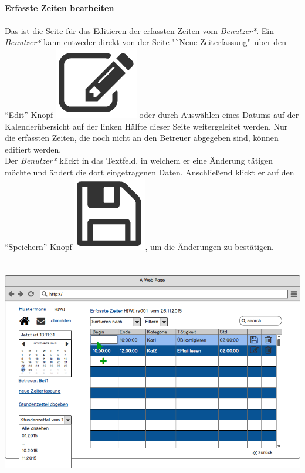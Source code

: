 \newpage
\textbf{\\Erfasste Zeiten bearbeiten}\\
\\
Das ist die Seite für das Editieren der erfassten Zeiten vom \emph{Benutzer*}.
Ein \emph{Benutzer*} kann entweder direkt von der Seite "`Neue Zeiterfassung"\  über den "`Edit"'-Knopf \includegraphics[scale=.1]{UI/Button/Edit.png} oder durch Auswählen eines Datums auf der Kalenderübersicht auf der linken Hälfte dieser Seite weitergeleitet werden. Nur die erfassten Zeiten, die noch nicht an den Betreuer abgegeben sind, können editiert werden.\\
Der \emph{Benutzer*} klickt in das Textfeld, in welchem er eine Änderung tätigen möchte und ändert die dort eingetragenen Daten. Anschließend klickt er auf den "`Speichern"'-Knopf \includegraphics[scale=.1]{UI/Button/Save.png}, um die Änderungen zu bestätigen.\\
\\
\\
\includegraphics[width=\linewidth]{UI/Benutzer/Editieren.png}





